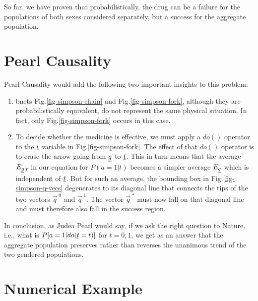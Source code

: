 So far, we have proven that probabilistically, 
the drug can be a failure for the populations
 of both sexes considered separately, 
but a success for the aggregate population.

\section{Pearl Causality}

Pearl Causality would add 
the following two 
important insights 
to this problem:
\begin{enumerate}
\item bnets Fig.\ref{fig-simpson-chain} 
and Fig.\ref{fig-simpson-fork}, 
although they are
probabilistically equivalent, 
do not represent the same physical
 situation. In fact, only
 Fig.\ref{fig-simpson-fork} 
occurs in this case.
\item To decide whether the
 medicine is effective, we 
must apply a $do()$ operator to
 the ${\underline{t}}$ variable in
 Fig.\ref{fig-simpson-fork}. 
The effect of that $do()$ operator
 is to erase the arrow going 
from $ {\underline{g}}$ to $ {\underline{t}}$. This in turn means
 that the average $ E_{\underline{g}|t}$
 in our equation for $ P(a=1|t)$
 becomes a simpler average $ E_{\underline{g}}$
 which is independent of $ {\underline{t}}$. 
But for such an average,
 the
 bounding box in Fig.\ref{fig-simpson-q-vecs}
 degenerates to its diagonal 
line that connects the tips
 of the two vectors $ \vec{q}^{\;0}$
 and $ \vec{q}^{\;1}$. The vector 
$ \vec{q}^{\;*}$ must now fall on 
that diagonal line and must therefore
 also fall in the success region.
\end{enumerate}
In conclusion, as Judea Pearl would say,
 if we ask the right question to Nature,
 i.e., what is
 $ P[a=1 | do(\underline{t}=t)]$ for $ t=0,1$,
 we get as an answer that the 
aggregate population preserves 
rather than reverses the
 unanimous trend of the 
two gendered populations.
\newpage
\section{Numerical Example}

